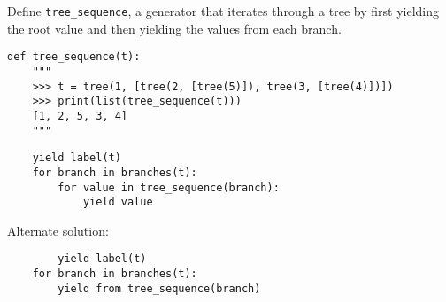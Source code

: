 \begin{blocksection}
\question Define \lstinline$tree_sequence$, a generator that iterates through a tree by first yielding the root value and then yielding the values from each branch.

\begin{lstlisting}
def tree_sequence(t):
    """
    >>> t = tree(1, [tree(2, [tree(5)]), tree(3, [tree(4)])])
    >>> print(list(tree_sequence(t)))
    [1, 2, 5, 3, 4]
    """
\end{lstlisting}

\begin{solution}[1.5in]
\begin{lstlisting}
	yield label(t)
	for branch in branches(t):
		for value in tree_sequence(branch):
			yield value
\end{lstlisting}
Alternate solution:
\begin{lstlisting}
        yield label(t)
	for branch in branches(t):
		yield from tree_sequence(branch)
\end{lstlisting}
\end{solution}
\end{blocksection}
